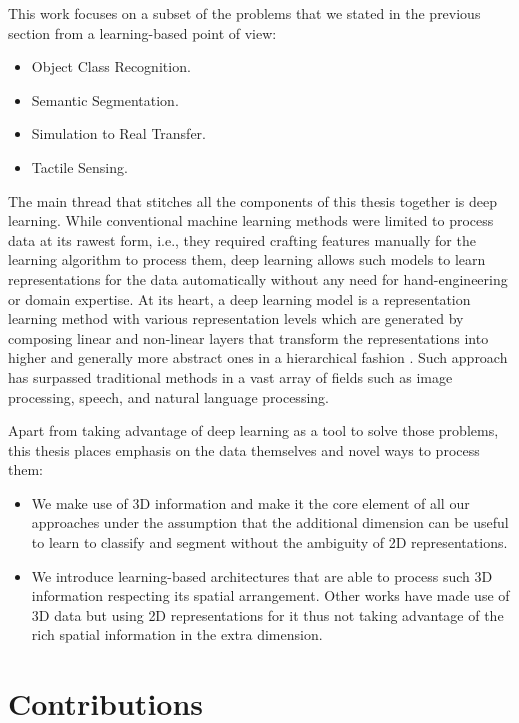 This work focuses on a subset of the problems that we stated in the previous section from a learning-based point of view:

\begin{itemize}
    \item Object Class Recognition.
    \item Semantic Segmentation.
    \item Simulation to Real Transfer.
    \item Tactile Sensing.
\end{itemize}

The main thread that stitches all the components of this thesis together is deep learning. While conventional machine learning methods were limited to process data at its rawest form, i.e., they required crafting features manually for the learning algorithm to process them, deep learning allows such models to learn representations for the data automatically without any need for hand-engineering or domain expertise. At its heart, a deep learning model is a representation learning method with various representation levels which are generated by composing linear and non-linear layers that transform the representations into higher and generally more abstract ones in a hierarchical fashion \cite{Lecun2015}. Such approach has surpassed traditional methods in a vast array of fields such as image processing, speech, and natural language processing.

\newpage

Apart from taking advantage of deep learning as a tool to solve those problems, this thesis places emphasis on the data themselves and novel ways to process them:

\begin{itemize}
    \item We make use of \ac{3D} information and make it the core element of all our approaches under the assumption that the additional dimension can be useful to learn to classify and segment without the ambiguity of \ac{2D} representations.
    \item We introduce learning-based architectures that are able to process such \ac{3D} information respecting its spatial arrangement. Other works have made use of \ac{3D} data but using \ac{2D} representations for it thus not taking advantage of the rich spatial information in the extra dimension.
\end{itemize}

\section{Contributions}
\label{cha:introduction:sec:contributions}

